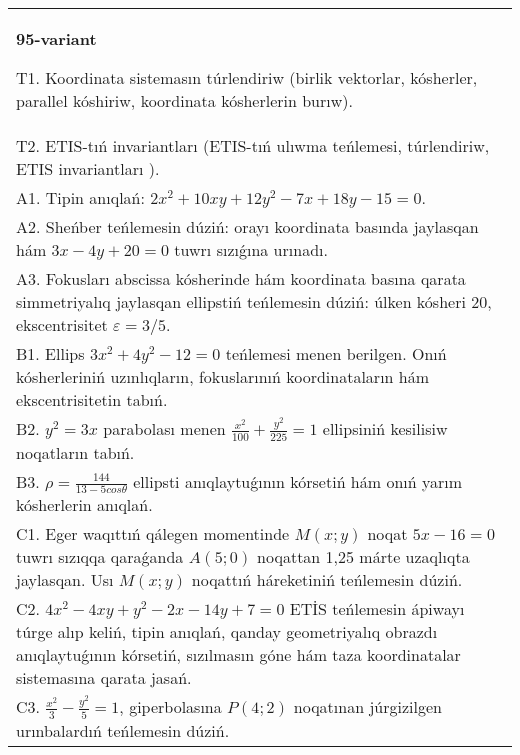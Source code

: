 \documentclass{article}
\begin{document}
\begin{tabular}{m{17cm}}
\textbf{95-variant}
\newline

T1. Koordinata sistemasın túrlendiriw (birlik vektorlar, kósherler, parallel kóshiriw, koordinata kósherlerin burıw).\\

T2. ETIS-tıń invariantları (ETIS-tıń ulıwma teńlemesi, túrlendiriw, ETIS invariantları ).\\

A1. Tipin anıqlań: $2 x^{2}+10 xy+12 y^{2}-7 x+18 y-15=0$.\\

A2. Sheńber teńlemesin dúziń: orayı koordinata basında jaylasqan hám $3 x-4 y+20=0$ tuwrı sızıǵına urınadı.\\

A3. Fokusları abscissa kósherinde hám koordinata basına qarata simmetriyalıq jaylasqan ellipstiń teńlemesin dúziń: úlken kósheri $20$, ekscentrisitet $\varepsilon=3/5$.\\

B1. Ellips $3x^{2} + 4y^{2} - 12 = 0$ teńlemesi menen berilgen. Onıń kósherleriniń uzınlıqların, fokuslarınıń koordinataların hám ekscentrisitetin tabıń.  \\

B2. $y^{2} = 3x$ parabolası menen $\frac{x^{2}}{100} + \frac{y^{2}}{225} = 1$ ellipsiniń kesilisiw noqatların tabıń.  \\

B3. $\rho = \frac{144}{13 - 5cos\theta}$ ellipsti anıqlaytuǵının kórsetiń hám onıń yarım kósherlerin anıqlań.\\

C1. Eger waqıttıń qálegen momentinde $M(x;y)$ noqat $5x - 16 = 0$ tuwrı sızıqqa qaraǵanda $A(5;0)$ noqattan 1,25 márte uzaqlıqta jaylasqan. Usı $M(x;y)$ noqattıń háreketiniń teńlemesin dúziń.  \\

C2. $4x^{2} - 4xy + y^{2} - 2x - 14y + 7 = 0$ ETİS teńlemesin ápiwayı túrge alıp keliń, tipin anıqlań, qanday geometriyalıq obrazdı anıqlaytuǵının kórsetiń, sızılmasın góne hám taza koordinatalar sistemasına qarata jasań.  \\

C3. $\frac{x^{2}}{3} - \frac{y^{2}}{5} = 1$, giperbolasına $P(4;2)$ noqatınan júrgizilgen urınbalardıń teńlemesin dúziń.  \\

\end{tabular}
\vspace{1cm}
\end{document}
